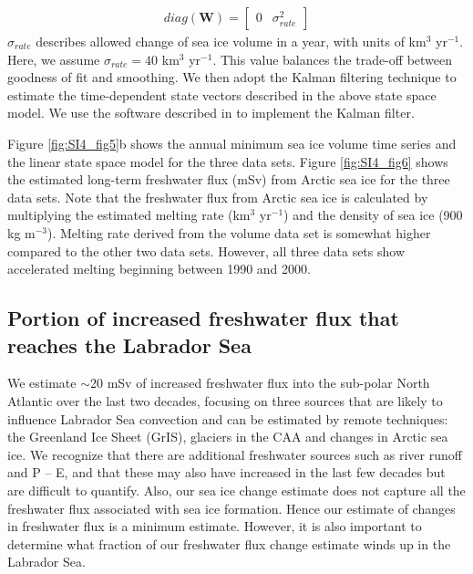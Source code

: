 \begin{equation} \label{eq:SI_chpt4_8}
\begin{aligned}
	diag(\textbf{W})=\begin{bmatrix} 0 & \sigma_{rate}^{2} \end{bmatrix}
\end{aligned}
\end{equation}
$\sigma_{rate}$ describes allowed change of sea ice volume in a year, with units of km$^{3}$ yr$^{-1}$.  Here, we assume $\sigma_{rate}=40$ km$^{3}$ yr$^{-1}$.  This value balances the trade-off between goodness of fit and smoothing.  We then adopt the Kalman filtering technique to estimate the time-dependent state vectors described in the above state space model.  We use the software described in \citet{laine2014analysing} to implement the Kalman filter.  

Figure \ref{fig:SI4_fig5}b shows the annual minimum sea ice volume time series and the linear state space model for the three data sets.  Figure \ref{fig:SI4_fig6} shows the estimated long-term freshwater flux (mSv) from Arctic sea ice for the three data sets.  Note that the freshwater flux from Arctic sea ice is calculated by multiplying the estimated melting rate (km$^{3}$ yr$^{-1}$) and the density of sea ice (900 kg m$^{-3}$). Melting rate derived from the volume data set is somewhat higher compared to the other two data sets.  However, all three data sets show accelerated melting beginning between 1990 and 2000.

\subsection*{Portion of increased freshwater flux that reaches the Labrador Sea}
We estimate $\sim$20 mSv of increased freshwater flux into the sub-polar North Atlantic over the last two decades, focusing on three sources that are likely to influence Labrador Sea convection and can be estimated by remote techniques:  the Greenland Ice Sheet (GrIS), glaciers in the CAA and changes in Arctic sea ice.  We recognize that there are additional freshwater sources such as river runoff and P – E, and that these may also have increased in the last few decades\cite[]{peterson2006trajectory} but are difficult to quantify\cite[]{bacon2015arctic}.  Also, our sea ice change estimate does not capture all the freshwater flux associated with sea ice formation.  Hence our estimate of changes in freshwater flux is a minimum estimate.  However, it is also important to determine what fraction of our freshwater flux change estimate winds up in the Labrador Sea.  

